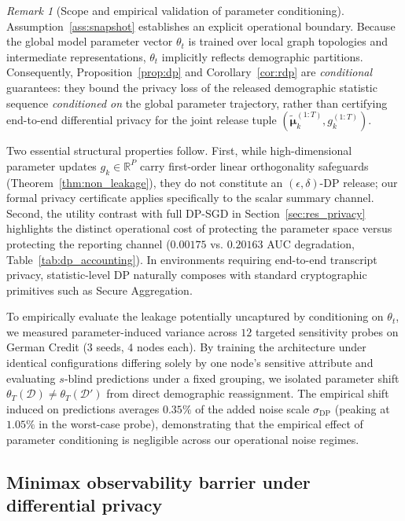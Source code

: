 \documentclass[preprint,12pt]{elsarticle}
\theoremstyle{plain}
\theoremstyle{definition}
\theoremstyle{remark}
\newtheorem{remark}{Remark}
\newcommand{\R}{\mathbb{R}}
\begin{document}
\begin{remark}[Scope and empirical validation of parameter conditioning]
\label{rem:dp_scope}
Assumption~\ref{ass:snapshot} establishes an explicit operational boundary. Because the global model parameter vector $\theta_t$ is trained over local graph topologies and intermediate representations, $\theta_t$ implicitly reflects demographic partitions. Consequently, Proposition~\ref{prop:dp} and Corollary~\ref{cor:rdp} are \emph{conditional} guarantees: they bound the privacy loss of the released demographic statistic sequence \emph{conditioned on} the global parameter trajectory, rather than certifying end-to-end differential privacy for the joint release tuple $(\tilde{\bm{\mu}}_k^{(1:T)}, g_k^{(1:T)})$.

Two essential structural properties follow. First, while high-dimensional parameter updates $g_k \in \R^P$ carry first-order linear orthogonality safeguards (Theorem~\ref{thm:non_leakage}), they do not constitute an $(\epsilon,\delta)$-DP release; our formal privacy certificate applies specifically to the scalar summary channel. Second, the utility contrast with full DP-SGD in Section~\ref{sec:res_privacy} highlights the distinct operational cost of protecting the parameter space versus protecting the reporting channel ($0.00175$ vs. $0.20163$ AUC degradation, Table~\ref{tab:dp_accounting}). In environments requiring end-to-end transcript privacy, statistic-level DP naturally composes with standard cryptographic primitives such as Secure Aggregation.

To empirically evaluate the leakage potentially uncaptured by conditioning on $\theta_t$, we measured parameter-induced variance across $12$ targeted sensitivity probes on German Credit ($3$ seeds, $4$ nodes each). By training the architecture under identical configurations differing solely by one node's sensitive attribute and evaluating $s$-blind predictions under a fixed grouping, we isolated parameter shift $\theta_T(\mathcal{D}) \neq \theta_T(\mathcal{D}')$ from direct demographic reassignment. The empirical shift induced on predictions averages $0.35\%$ of the added noise scale $\sigma_{\mathrm{DP}}$ (peaking at $1.05\%$ in the worst-case probe), demonstrating that the empirical effect of parameter conditioning is negligible across our operational noise regimes.
\end{remark}

\subsection{Minimax observability barrier under differential privacy}
\label{sec:theory_observability}
\end{document}
